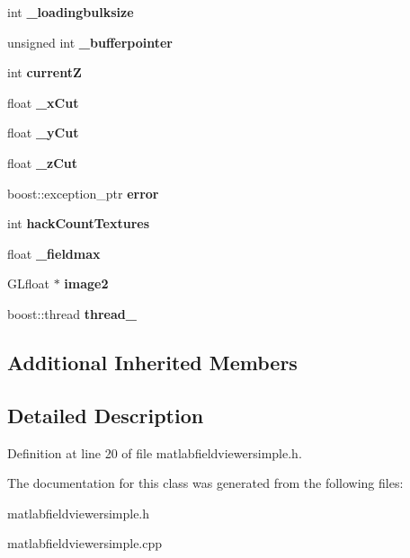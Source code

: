 \begin{DoxyCompactItemize}
\item 
int {\bfseries \-\_\-loadingbulksize}\label{classSoundfieldViewer_1_1MatlabFieldViewerSimple_a076920fc113aa7653ef59a3e77de20ee}

\item 
unsigned int {\bfseries \-\_\-bufferpointer}\label{classSoundfieldViewer_1_1MatlabFieldViewerSimple_a2ae41ef5e7a5f3b137908ebae105f1a7}

\item 
int {\bfseries current\-Z}\label{classSoundfieldViewer_1_1MatlabFieldViewerSimple_ae398a485ce9e5c05edb0515506ac48d8}

\item 
float {\bfseries \-\_\-x\-Cut}\label{classSoundfieldViewer_1_1MatlabFieldViewerSimple_aef80ab9db6b38b741a52bfdc88ed2a41}

\item 
float {\bfseries \-\_\-y\-Cut}\label{classSoundfieldViewer_1_1MatlabFieldViewerSimple_afc35f4ea8ab58b86799c40ef175ef887}

\item 
float {\bfseries \-\_\-z\-Cut}\label{classSoundfieldViewer_1_1MatlabFieldViewerSimple_a473d24f4e7d167154e5138be82f4a8c6}

\item 
boost\-::exception\-\_\-ptr {\bfseries error}\label{classSoundfieldViewer_1_1MatlabFieldViewerSimple_a7098cfe33feb56159baf782ba6227e86}

\item 
int {\bfseries hack\-Count\-Textures}\label{classSoundfieldViewer_1_1MatlabFieldViewerSimple_adf7aa1b6c512941aed2819b2eae90a2d}

\item 
float {\bfseries \-\_\-fieldmax}\label{classSoundfieldViewer_1_1MatlabFieldViewerSimple_a45dd6c495f32726c0b9e5e01218737cc}

\item 
G\-Lfloat $\ast$ {\bfseries image2}\label{classSoundfieldViewer_1_1MatlabFieldViewerSimple_ac8dc3a83f9fa51ac31b173c6bf009780}

\item 
boost\-::thread {\bfseries thread\-\_}\label{classSoundfieldViewer_1_1MatlabFieldViewerSimple_a9550c21f38b9e9b6b147bace166f2716}

\end{DoxyCompactItemize}
\subsection*{Additional Inherited Members}


\subsection{Detailed Description}


Definition at line 20 of file matlabfieldviewersimple.\-h.



The documentation for this class was generated from the following files\-:\begin{DoxyCompactItemize}
\item 
matlabfieldviewersimple.\-h\item 
matlabfieldviewersimple.\-cpp\end{DoxyCompactItemize}
